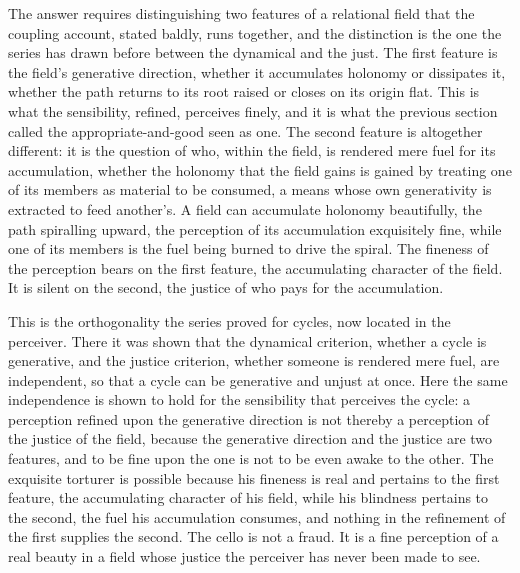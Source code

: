 The answer requires distinguishing two features of a relational field that the coupling account, stated baldly, runs together, and the distinction is the one the series has drawn before between the dynamical and the just. The first feature is the field's generative direction, whether it accumulates holonomy or dissipates it, whether the path returns to its root raised or closes on its origin flat. This is what the sensibility, refined, perceives finely, and it is what the previous section called the appropriate-and-good seen as one. The second feature is altogether different: it is the question of who, within the field, is rendered mere fuel for its accumulation, whether the holonomy that the field gains is gained by treating one of its members as material to be consumed, a means whose own generativity is extracted to feed another's. A field can accumulate holonomy beautifully, the path spiralling upward, the perception of its accumulation exquisitely fine, while one of its members is the fuel being burned to drive the spiral. The fineness of the perception bears on the first feature, the accumulating character of the field. It is silent on the second, the justice of who pays for the accumulation.


This is the orthogonality the series proved for cycles, now located in the perceiver. There it was shown that the dynamical criterion, whether a cycle is generative, and the justice criterion, whether someone is rendered mere fuel, are independent, so that a cycle can be generative and unjust at once. Here the same independence is shown to hold for the sensibility that perceives the cycle: a perception refined upon the generative direction is not thereby a perception of the justice of the field, because the generative direction and the justice are two features, and to be fine upon the one is not to be even awake to the other. The exquisite torturer is possible because his fineness is real and pertains to the first feature, the accumulating character of his field, while his blindness pertains to the second, the fuel his accumulation consumes, and nothing in the refinement of the first supplies the second. The cello is not a fraud. It is a fine perception of a real beauty in a field whose justice the perceiver has never been made to see.

